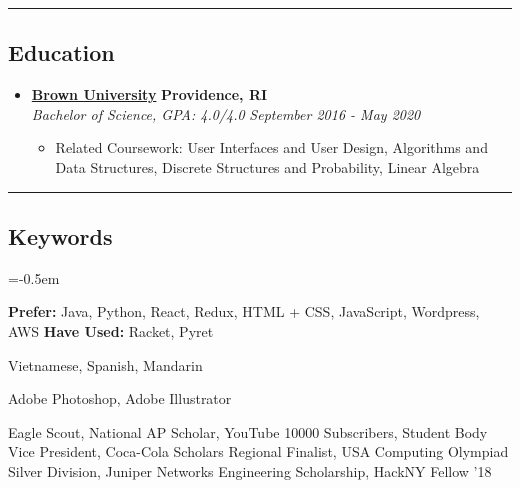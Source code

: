 \documentclass[10pt,letterpaper]{article}
\begin{document}

\hrule
\vspace{-1.0em}
\subsection*{Education}
  \begin{itemize}
    \parskip=-0.5em

    \item[]
    {\href{https://www.brown.edu/}{\textbf{Brown University}} \hfill
      \textbf{Providence, RI}}
    \\
    {\emph{Bachelor of Science, GPA: 4.0/4.0} \hfill
      \emph{September 2016 - May 2020}}

    \begin{itemize}[label=\textbullet]
      \item Related Coursework: User Interfaces and User Design, Algorithms and Data Structures, Discrete Structures and Probability, Linear Algebra
    \end{itemize}
  \end{itemize}

\hrule
\vspace{-1.0em}
\subsection*{Keywords}
\begin{description}[labelindent=\parindent]
  \parskip=-0.5em
\item[Languages + Frameworks:] \textbf{Prefer:} Java, Python, React, Redux, HTML + CSS, JavaScript, Wordpress, AWS \textbf{Have Used:} Racket, Pyret 
  \item[Human Languages:] Vietnamese, Spanish, Mandarin
  \item[Design:] Adobe Photoshop, Adobe Illustrator
  \item[Accomplishments:] Eagle Scout, National AP Scholar, YouTube 10000 Subscribers, Student Body Vice President, Coca-Cola Scholars Regional Finalist, USA Computing Olympiad Silver Division, Juniper Networks Engineering Scholarship, HackNY Fellow '18
\end{description}
\end{document}
